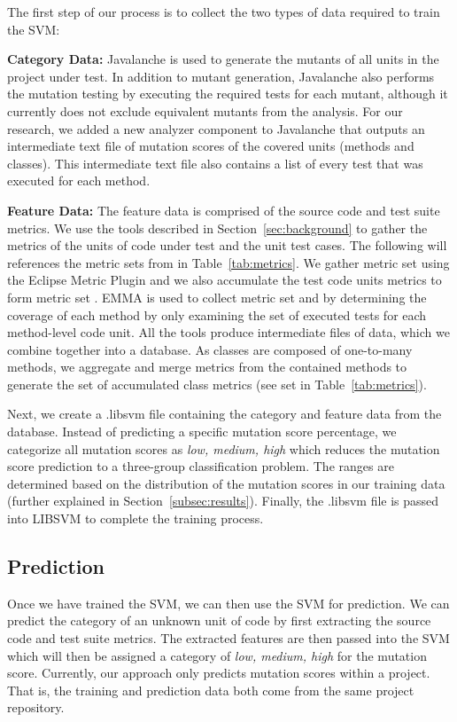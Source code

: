 \documentclass[conference]{IEEEtran}
\begin{document}
The first step of our process is to collect the two types of data required to train the SVM:

\textbf{Category Data:} Javalanche is used to generate the mutants of all units in the project under test. In addition to mutant generation, Javalanche also performs the mutation testing by executing the required tests for each mutant, although it currently does not exclude equivalent mutants from the analysis. For our research, we added a new analyzer component to Javalanche that outputs an intermediate text file of mutation scores of the covered units (methods and classes). This intermediate text file also contains a list of every test that was executed for each method.

\textbf{Feature Data:} The feature data is comprised of the source code and test suite metrics. We use the tools described in Section~\ref{sec:background} to gather the metrics of the units of code under test and the unit test cases. The following will references the metric sets from in Table~\ref{tab:metrics}. We gather metric set  using the Eclipse Metric Plugin and we also accumulate the test code units metrics to form metric set . EMMA is used to collect metric set  and  by determining the coverage of each method by only examining the set of executed tests for each method-level code unit. All the tools produce intermediate files of data, which we combine together into a database. As classes are composed of one-to-many methods, we aggregate and merge metrics from the contained methods to generate the set of accumulated class metrics (see set  in Table~\ref{tab:metrics}).

Next, we create a .libsvm file containing the category and feature data from the database. Instead of predicting a specific mutation score percentage, we categorize all mutation scores as \textit{low, medium, high} which reduces the mutation score prediction to a three-group classification problem. The ranges are determined based on the distribution of the mutation scores in our training data (further explained in Section~\ref{subsec:results}). Finally, the .libsvm file is passed into LIBSVM to complete the training process.


\subsection{Prediction}
\label{subsec:prediction}
Once we have trained the SVM, we can then use the SVM for prediction. We can predict the category of an unknown unit of code by first extracting the source code and test suite metrics. The extracted features are then passed into the SVM which will then be assigned a category of \textit{low, medium, high} for the mutation score.  Currently, our approach only predicts mutation scores within a project. That is, the training and prediction data both come from the same project repository.
\end{document}
